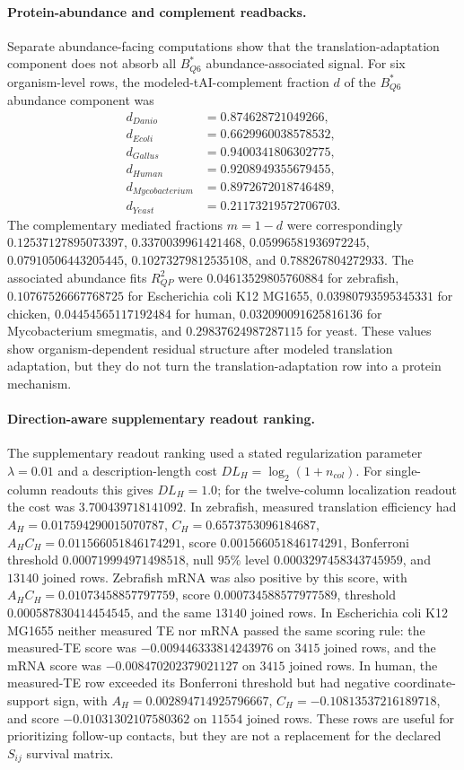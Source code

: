\paragraph{Protein-abundance and complement readbacks.}
Separate abundance-facing computations show that the translation-adaptation component does not absorb all $B^*_{Q6}$ abundance-associated signal.  For six organism-level rows, the modeled-tAI-complement fraction $d$ of the $B^*_{Q6}$ abundance component was
$$
\begin{aligned}
 d_{Danio} &= 0.874628721049266,\\
 d_{Ecoli} &= 0.6629960038578532,\\
 d_{Gallus} &= 0.9400341806302775,\\
 d_{Human} &= 0.9208949355679455,\\
 d_{Mycobacterium} &= 0.8972672018746489,\\
 d_{Yeast} &= 0.21173219572706703.
\end{aligned}
$$
The complementary mediated fractions $m=1-d$ were correspondingly $0.12537127895073397$, $0.3370039961421468$, $0.05996581936972245$, $0.07910506443205445$, $0.10273279812535108$, and $0.788267804272933$.  The associated abundance fits $R^2_{QP}$ were $0.04613529805760884$ for zebrafish, $0.10767526667768725$ for Escherichia coli K12 MG1655, $0.03980793595345331$ for chicken, $0.04454565117192484$ for human, $0.032090091625816136$ for Mycobacterium smegmatis, and $0.29837624987287115$ for yeast.  These values show organism-dependent residual structure after modeled translation adaptation, but they do not turn the translation-adaptation row into a protein mechanism.

\paragraph{Direction-aware supplementary readout ranking.}
The supplementary readout ranking used a stated regularization parameter $\lambda=0.01$ and a description-length cost $DL_H=\log_2(1+n_{col})$.  For single-column readouts this gives $DL_H=1.0$; for the twelve-column localization readout the cost was $3.700439718141092$.  In zebrafish, measured translation efficiency had $A_H=0.017594290015070787$, $C_H=0.6573753096184687$, $A_HC_H=0.011566051846174291$, score $0.001566051846174291$, Bonferroni threshold $0.000719994971498518$, null $95\%$ level $0.0003297458343745959$, and $13140$ joined rows.  Zebrafish mRNA was also positive by this score, with $A_HC_H=0.01073458857797759$, score $0.000734588577977589$, threshold $0.000587830414454545$, and the same $13140$ joined rows.  In Escherichia coli K12 MG1655 neither measured TE nor mRNA passed the same scoring rule: the measured-TE score was $-0.009446333814243976$ on $3415$ joined rows, and the mRNA score was $-0.008470202379021127$ on $3415$ joined rows.  In human, the measured-TE row exceeded its Bonferroni threshold but had negative coordinate-support sign, with $A_H=0.002894714925796667$, $C_H=-0.10813537216189718$, and score $-0.01031302107580362$ on $11554$ joined rows.  These rows are useful for prioritizing follow-up contacts, but they are not a replacement for the declared $S_{ij}$ survival matrix.

